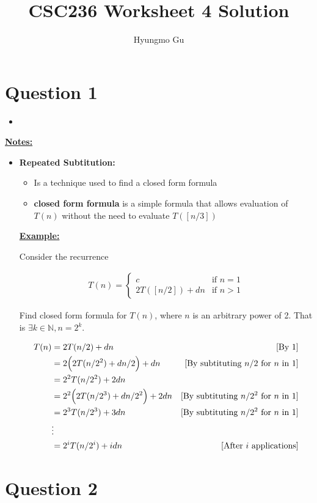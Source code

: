 \documentclass[12pt]{article}
\begin{document}
\title{CSC236 Worksheet 4 Solution}
\author{Hyungmo Gu}
\maketitle

\section*{Question 1}
\begin{itemize}
    \item
\end{itemize}

\bigskip

\underline{\textbf{Notes:}}

\begin{itemize}
    \item \textbf{Repeated Subtitution:}

    \begin{itemize}
        \item Is a technique used to find a closed form formula
        \item \textbf{closed form formula} is a simple formula that allows evaluation
        of $T(n)$ without the need to evaluate $T([n/3])$
    \end{itemize}

    \bigskip

    \begin{mdframed}
        \underline{\textbf{Example:}}

        \bigskip

        Consider the recurrence

        \begin{align}
            T(n) =
            \begin{cases}
            c & \text{if $n = 1$}\\
            2T([n/2]) + dn & \text{if $n > 1$}
            \end{cases}
        \end{align}

        Find closed form formula for $T(n)$, where $n$ is an arbitrary power of 2.
        That is $\exists k \in \mathbb{N}, n = 2^k$.

        \bigskip

        \begin{align}
            T(n) &= 2T(n/2) + dn & [\text{By 1}]\\
            &= 2\Bigl(2T(n/2^2) + dn/2\Bigr) + dn & [\text{By subtituting $n/2$ for $n$ in 1}]\\
            &= 2^2T(n/2^2) + 2dn\\
            &= 2^2\Bigl(2T(n/2^3) + dn/2^2\Bigr) + 2dn & [\text{By subtituting $n/2^2$ for $n$ in 1}]\\
            &= 2^3T(n/2^3) + 3dn & [\text{By subtituting $n/2^2$ for $n$ in 1}]\\
            &\vdots\\
            &= 2^iT(n/2^i) + idn & [\text{After $i$ applications}]
        \end{align}
    \end{mdframed}

\end{itemize}

\section*{Question 2}
\end{document}

